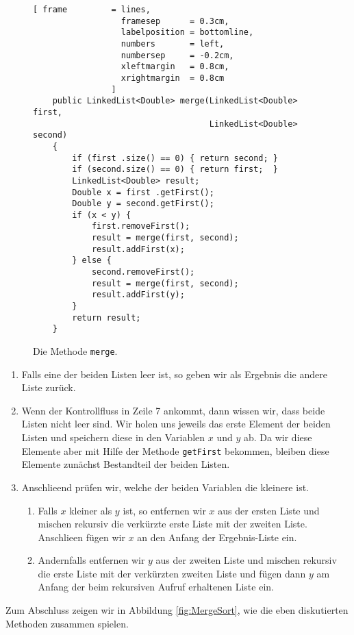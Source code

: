 \begin{figure}[!ht]
  \centering
\begin{Verbatim}[ frame         = lines, 
                  framesep      = 0.3cm, 
                  labelposition = bottomline,
                  numbers       = left,
                  numbersep     = -0.2cm,
                  xleftmargin   = 0.8cm,
                  xrightmargin  = 0.8cm
                ]
    public LinkedList<Double> merge(LinkedList<Double> first, 
                                    LinkedList<Double> second) 
    {
        if (first .size() == 0) { return second; }
        if (second.size() == 0) { return first;  }
        LinkedList<Double> result;
        Double x = first .getFirst();
        Double y = second.getFirst();
        if (x < y) {
            first.removeFirst();
            result = merge(first, second);
            result.addFirst(x);
        } else {
            second.removeFirst();
            result = merge(first, second);
            result.addFirst(y);
        }
        return result;
    }
\end{Verbatim}
\vspace*{-0.3cm}
  \caption{Die Methode \texttt{merge}.}
  \label{fig:merge}
\end{figure}

\begin{enumerate}
\item Falls eine der beiden Listen leer ist, so geben wir als Ergebnis die
      andere Liste zur\"uck.
\item Wenn der Kontrollfluss in Zeile 7 ankommt, dann wissen wir, dass beide Listen
      nicht leer sind.  Wir holen uns jeweils das erste Element der beiden Listen
      und speichern diese in den Variablen $x$ und $y$ ab.  Da wir diese Elemente
      aber mit Hilfe der Methode \texttt{getFirst} bekommen, bleiben diese Elemente
      zun\"achst Bestandteil der beiden Listen.
\item Anschlie\3end pr\"ufen wir, welche der beiden Variablen die kleinere ist.
      \begin{enumerate}
      \item Falls $x$ kleiner als $y$ ist, so entfernen wir $x$ aus der ersten Liste
            und mischen rekursiv die verk\"urzte erste Liste mit der zweiten Liste.
            Anschlie\3en f\"ugen wir $x$ an den Anfang der Ergebnis-Liste ein.
      \item Andernfalls entfernen wir $y$ aus der zweiten Liste
            und mischen rekursiv die erste Liste mit der verk\"urzten zweiten Liste und
            f\"ugen dann $y$ am Anfang der beim rekursiven Aufruf erhaltenen Liste ein.
      \end{enumerate}
\end{enumerate}
Zum Abschluss zeigen wir in Abbildung \ref{fig:MergeSort}, wie die eben diskutierten
Methoden zusammen spielen.

